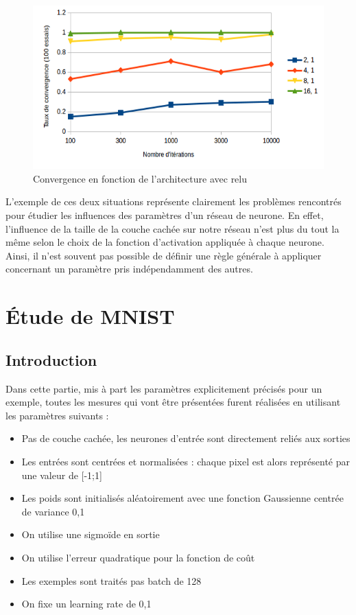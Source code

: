 \documentclass{report}
\theoremstyle{plain}
\theoremstyle{definition}
\theoremstyle{remark}
\begin{document}
\begin{figure}[!h]
\begin{center}
\includegraphics[scale=0.6]{images/xor_architecture_relu.png}
\caption{Convergence en fonction de l'architecture avec relu}
\label{xor_architecture_relu}
\end{center}
\end{figure}

L'exemple de ces deux situations représente clairement les problèmes rencontrés pour étudier les influences des paramètres d'un réseau de neurone. En effet, l'influence de la taille de la couche cachée sur notre réseau n'est plus du tout la même selon le choix de la fonction d'activation appliquée à chaque neurone. Ainsi, il n'est souvent pas possible de définir une règle générale à appliquer concernant un paramètre pris indépendamment des autres.

\section{\'Etude de MNIST}

\subsection{Introduction}
Dans cette partie, mis à part les paramètres explicitement précisés pour un exemple, toutes les mesures qui vont être présentées furent réalisées en utilisant les paramètres suivants :
\begin{itemize}
\item Pas de couche cachée, les neurones d'entrée sont directement reliés aux sorties
\item Les entrées sont centrées et normalisées : chaque pixel est alors représenté par une valeur de [-1;1]
\item Les poids sont initialisés aléatoirement avec une fonction Gaussienne centrée de variance 0,1
\item On utilise une sigmoïde en sortie
\item On utilise l'erreur quadratique pour la fonction de coût
\item Les exemples sont traités pas batch de 128
\item On fixe un learning rate de 0,1
\end{itemize}
\end{document}
